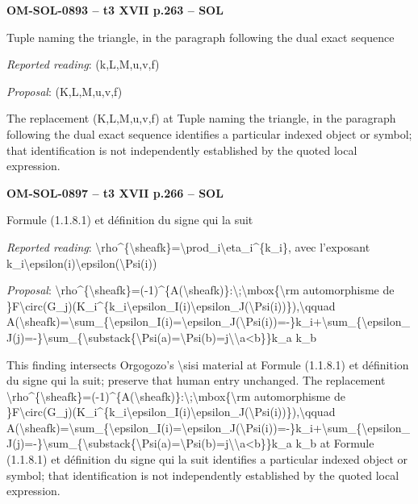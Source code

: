 \par\noindent\textbf{OM-SOL-0893 -- t3 XVII p.263 -- SOL}\par
Tuple naming the triangle, in the paragraph following the dual exact sequence\par
\emph{Reported reading}: (k,L,M,u,v,f)\par
\emph{Proposal}: (K,L,M,u,v,f)\par
The replacement (K,L,M,u,v,f) at Tuple naming the triangle, in the paragraph following the dual exact sequence identifies a particular indexed object or symbol; that identification is not independently established by the quoted local expression.\par
\par\noindent\textbf{OM-SOL-0897 -- t3 XVII p.266 -- SOL}\par
Formule (1.1.8.1) et définition du signe qui la suit\par
\emph{Reported reading}: \textbackslash{}rho\textasciicircum{}\{\textbackslash{}sheafk\}=\allowbreak \textbackslash{}prod\_i\textbackslash{}eta\_i\textasciicircum{}\{k\_i\}, avec l'exposant k\_i\textbackslash{}epsilon(i)\textbackslash{}epsilon(\textbackslash{}Psi(i))\par
\emph{Proposal}: \textbackslash{}rho\textasciicircum{}\{\textbackslash{}sheafk\}=\allowbreak (-1)\textasciicircum{}\{A(\textbackslash{}sheafk)\}:\textbackslash{};\textbackslash{}mbox\{\textbackslash{}rm automorphisme de \}F\textbackslash{}circ(G\_j)(K\_i\textasciicircum{}\{k\_i\textbackslash{}epsilon\_I(i)\textbackslash{}epsilon\_J(\textbackslash{}Psi(i))\}),\textbackslash{}qquad A(\textbackslash{}sheafk)=\allowbreak \textbackslash{}sum\_\{\textbackslash{}epsilon\_I(i)=\allowbreak \textbackslash{}epsilon\_J(\textbackslash{}Psi(i))=\allowbreak -\}k\_i+\textbackslash{}sum\_\{\textbackslash{}epsilon\_J(j)=\allowbreak -\}\textbackslash{}sum\_\{\textbackslash{}substack\{\textbackslash{}Psi(a)=\allowbreak \textbackslash{}Psi(b)=\allowbreak j\textbackslash{}\textbackslash{}a<b\}\}k\_a k\_b\par
This finding intersects Orgogozo's \textbackslash{}sisi material at Formule (1.1.8.1) et définition du signe qui la suit; preserve that human entry unchanged. The replacement \textbackslash{}rho\textasciicircum{}\{\textbackslash{}sheafk\}=\allowbreak (-1)\textasciicircum{}\{A(\textbackslash{}sheafk)\}:\textbackslash{};\textbackslash{}mbox\{\textbackslash{}rm automorphisme de \}F\textbackslash{}circ(G\_j)(K\_i\textasciicircum{}\{k\_i\textbackslash{}epsilon\_I(i)\textbackslash{}epsilon\_J(\textbackslash{}Psi(i))\}),\textbackslash{}qquad A(\textbackslash{}sheafk)=\allowbreak \textbackslash{}sum\_\{\textbackslash{}epsilon\_I(i)=\allowbreak \textbackslash{}epsilon\_J(\textbackslash{}Psi(i))=\allowbreak -\}k\_i+\textbackslash{}sum\_\{\textbackslash{}epsilon\_J(j)=\allowbreak -\}\textbackslash{}sum\_\{\textbackslash{}substack\{\textbackslash{}Psi(a)=\allowbreak \textbackslash{}Psi(b)=\allowbreak j\textbackslash{}\textbackslash{}a<b\}\}k\_a k\_b at Formule (1.1.8.1) et définition du signe qui la suit identifies a particular indexed object or symbol; that identification is not independently established by the quoted local expression.\par
